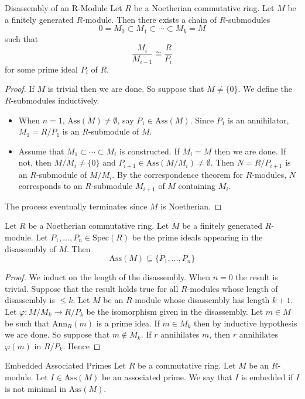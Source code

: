 \documentclass[a4paper]{article}
\begin{document}
\begin{thm}{Disassembly of an R-Module}{} Let $R$ be a Noetherian commutative ring. Let $M$ be a finitely generated $R$-module. Then there exists a chain of $R$-submodules $$0=M_0\subset M_1\subset\cdots\subset M_k=M$$ such that $$\frac{M_i}{M_{i-1}}\cong\frac{R}{P_i}$$ for some prime ideal $P_i$ of $R$. 
\begin{proof}
If $M$ is trivial then we are done. So suppose that $M\neq\{0\}$. We define the $R$-submodules inductively. 
\begin{itemize}
\item When $n=1$, $\text{Ass}(M)\neq\emptyset$, say $P_1\in\text{Ass}(M)$. Since $P_1$ is an annihilator, $M_1=R/P_1$ is an $R$-submodule of $M$.
\item Assume that $M_1\subset\cdots\subset M_i$ is constructed. If $M_i=M$ then we are done. If not, then $M/M_i\neq\{0\}$ and $P_{i+1}\in\text{Ass}(M/M_i)\neq\emptyset$. Then $N=R/P_{i+1}$ is an $R$-submodule of $M/M_i$. By the correspondence theorem for $R$-modules, $N$ corresponds to an $R$-submodule $M_{i+1}$ of $M$ containing $M_i$. 
\end{itemize}
The process eventually terminates since $M$ is Noetherian. 
\end{proof}
\end{thm}

\begin{prp}{}{} Let $R$ be a Noetherian commutative ring. Let $M$ be a finitely generated $R$-module. Let $P_1,\dots,P_n\in\text{Spec}(R)$ be the prime ideals appearing in the disassembly of $M$. Then $$\text{Ass}(M)\subseteq\{P_1,\dots,P_n\}$$ 
\begin{proof}
We induct on the length of the disassembly. When $n=0$ the result is trivial. Suppose that the result holds true for all $R$-modules whose length of disassembly is $\leq k$. Let $M$ be an $R$-module whose disassembly has length $k+1$. Let $\varphi:M/M_k\to R/P_k$ be the isomorphism given in the disassembly. Let $m\in M$ be such that $\text{Ann}_R(m)$ is a prime idea. If $m\in M_k$ then by inductive hypothesis we are done. So suppose that $m\notin M_k$. If $r$ annihilates $m$, then $r$ annihilates $\varphi(m)$ in $R/P_k$. Hence 
\end{proof}
\end{prp}

\begin{defn}{Embedded Associated Primes}{} Let $R$ be a commutative ring. Let $M$ be an $R$-module. Let $I\in\text{Ass}(M)$ be an associated prime. We say that $I$ is embedded if $I$ is not minimal in $\text{Ass}(M)$. 
\end{defn}
\end{document}

